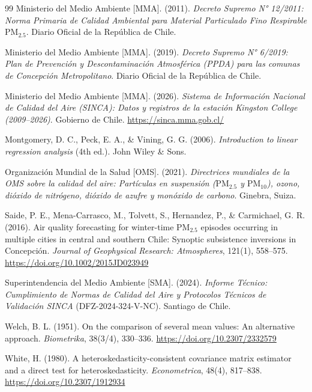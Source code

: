 \documentclass[10pt,twocolumn,a4paper]{article}
\begin{document}
\begin{thebibliography}{99}
Ministerio del Medio Ambiente [MMA]. (2011). \textit{Decreto Supremo N° 12/2011: Norma Primaria de Calidad Ambiental para Material Particulado Fino Respirable $\text{PM}_{2.5}$}. Diario Oficial de la República de Chile.

Ministerio del Medio Ambiente [MMA]. (2019). \textit{Decreto Supremo N° 6/2019: Plan de Prevención y Descontaminación Atmosférica (PPDA) para las comunas de Concepción Metropolitano}. Diario Oficial de la República de Chile.

Ministerio del Medio Ambiente [MMA]. (2026). \textit{Sistema de Información Nacional de Calidad del Aire (SINCA): Datos y registros de la estación Kingston College (2009--2026)}. Gobierno de Chile. \url{https://sinca.mma.gob.cl/}

Montgomery, D. C., Peck, E. A., \& Vining, G. G. (2006). \textit{Introduction to linear regression analysis} (4th ed.). John Wiley \& Sons.

Organización Mundial de la Salud [OMS]. (2021). \textit{Directrices mundiales de la OMS sobre la calidad del aire: Partículas en suspensión ($\text{PM}_{2.5}$ y $\text{PM}_{10}$), ozono, dióxido de nitrógeno, dióxido de azufre y monóxido de carbono}. Ginebra, Suiza.

Saide, P. E., Mena-Carrasco, M., Tolvett, S., Hernandez, P., \& Carmichael, G. R. (2016). Air quality forecasting for winter-time $\text{PM}_{2.5}$ episodes occurring in multiple cities in central and southern Chile: Synoptic subsistence inversions in Concepción. \textit{Journal of Geophysical Research: Atmospheres}, 121(1), 558--575. \url{https://doi.org/10.1002/2015JD023949}

Superintendencia del Medio Ambiente [SMA]. (2024). \textit{Informe Técnico: Cumplimiento de Normas de Calidad del Aire y Protocolos Técnicos de Validación SINCA} (DFZ-2024-324-V-NC). Santiago de Chile.

Welch, B. L. (1951). On the comparison of several mean values: An alternative approach. \textit{Biometrika}, 38(3/4), 330--336. \url{https://doi.org/10.2307/2332579}

White, H. (1980). A heteroskedasticity-consistent covariance matrix estimator and a direct test for heteroskedasticity. \textit{Econometrica}, 48(4), 817--838. \url{https://doi.org/10.2307/1912934}
\end{thebibliography}
\end{document}
